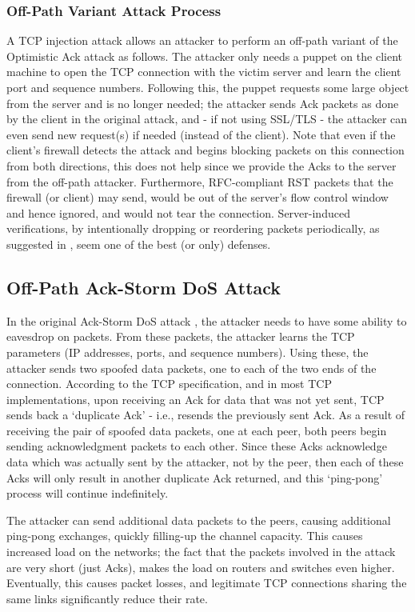 \documentclass[conference]{IEEEtran}
\begin{document}
\subsubsection{Off-Path Variant Attack Process}
A TCP injection attack allows an attacker to perform an off-path variant of the Optimistic Ack attack as follows. The attacker only needs a puppet on the client machine to open the TCP connection with the victim server and learn the client port and sequence numbers. Following this, the puppet requests some large object from the server and is no longer needed; the attacker sends Ack packets as done by the client in the original attack, and - if not using SSL/TLS - the attacker can even send new request(s) if needed (instead of the client). Note that even if the client's firewall detects the attack and begins blocking packets on this connection from both directions, this does not help since we provide the Acks to the server from the off-path attacker. Furthermore, RFC-compliant RST packets that the firewall (or client) may send, would be out of the server's flow control window and hence ignored, and would not tear the connection. Server-induced verifications, by intentionally dropping or reordering packets periodically, as suggested in \cite{SBB05:OptAck}, seem one of the best (or only) defenses. 


\subsection{Off-Path Ack-Storm DoS Attack}

In the original Ack-Storm DoS attack \cite{AH11:Ack}, the attacker needs to have some ability to eavesdrop on packets. From these packets, the attacker learns the TCP parameters (IP addresses, ports, and sequence numbers). Using these, the attacker sends two spoofed data packets, one to each of the two ends of the connection. According to the TCP specification, and in most TCP implementations, upon receiving an Ack for data that was not yet sent, TCP sends back a `duplicate Ack' - i.e., resends the previously sent Ack. As a result of receiving the pair of spoofed data packets, one at each peer, both peers begin sending acknowledgment packets to each other. Since these Acks acknowledge data which was actually sent by the attacker, not by the peer, then each of these Acks will only result in another duplicate Ack returned, and this `ping-pong' process will continue indefinitely. 

The attacker can send additional data packets to the peers, causing additional ping-pong exchanges, quickly filling-up the channel capacity. This causes increased load on the networks; the fact that the packets involved in the attack are very short (just Acks),  makes the load on routers and switches even higher. Eventually, this causes packet losses, and legitimate TCP connections sharing the same links significantly reduce their rate. 
\end{document}
